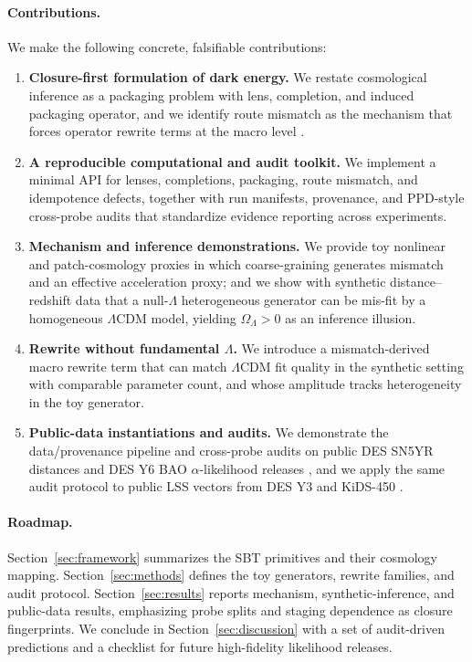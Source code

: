 \documentclass[11pt]{article}
\theoremstyle{definition}
\theoremstyle{plain}
\theoremstyle{remark}
\begin{document}
\paragraph{Contributions.}
We make the following concrete, falsifiable contributions:
\begin{enumerate}
  \item \textbf{Closure-first formulation of dark energy.} We restate cosmological inference as a packaging problem with lens, completion, and induced packaging operator, and we identify route mismatch as the mechanism that forces operator rewrite terms at the macro level \cite{Tsiokos2026SixBirds,Tsiokos2026WakeStone}.
  \item \textbf{A reproducible computational and audit toolkit.} We implement a minimal API for lenses, completions, packaging, route mismatch, and idempotence defects, together with run manifests, provenance, and PPD-style cross-probe audits that standardize evidence reporting across experiments.
  \item \textbf{Mechanism and inference demonstrations.} We provide toy nonlinear and patch-cosmology proxies in which coarse-graining generates mismatch and an effective acceleration proxy; and we show with synthetic distance--redshift data that a null-$\Lambda$ heterogeneous generator can be mis-fit by a homogeneous $\Lambda$CDM model, yielding $\Omega_\Lambda>0$ as an inference illusion.
  \item \textbf{Rewrite without fundamental $\Lambda$.} We introduce a mismatch-derived macro rewrite term that can match $\Lambda$CDM fit quality in the synthetic setting with comparable parameter count, and whose amplitude tracks heterogeneity in the toy generator.
  \item \textbf{Public-data instantiations and audits.} We demonstrate the data/provenance pipeline and cross-probe audits on public DES SN5YR distances and DES Y6 BAO $\alpha$-likelihood releases \cite{DES2024SN5YRCosmology,DES2024SN5YRData,DES2024Y6BAO}, and we apply the same audit protocol to public LSS vectors from DES Y3 and KiDS-450 \cite{DES2022Y3_3x2pt,vanUitert2018KiDSGAMA,KiDSDataProducts}.
\end{enumerate}

\paragraph{Roadmap.}
Section~\ref{sec:framework} summarizes the SBT primitives and their cosmology mapping.
Section~\ref{sec:methods} defines the toy generators, rewrite families, and audit protocol.
Section~\ref{sec:results} reports mechanism, synthetic-inference, and public-data results, emphasizing probe splits and staging dependence as closure fingerprints.
We conclude in Section~\ref{sec:discussion} with a set of audit-driven predictions and a checklist for future high-fidelity likelihood releases.
\end{document}
